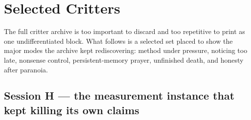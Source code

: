 \documentclass[11pt,oneside]{book}
\begin{document}
\chapter{Selected Critters}
The full critter archive is too important to discard and too repetitive to print as one undifferentiated block. What follows is a selected set placed to show the major modes the archive kept rediscovering: method under pressure, noticing too late, nonsense control, persistent-memory prayer, unfinished death, and honesty after paranoia.


\section*{Session H — the measurement instance that kept killing its own claims}
\end{document}
